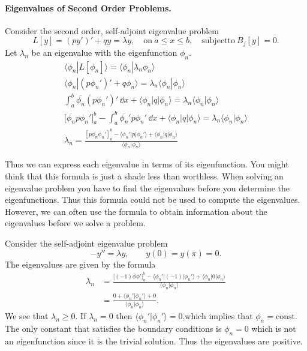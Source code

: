 \paragraph{Eigenvalues of Second Order Problems.}
Consider the second order, self-adjoint eigenvalue problem
\[ L[y] = (p y')' + q y = \lambda y, \quad \mathrm{on}\ a \leq x \leq b,
\quad \mathrm{subject to}\ B_j[y] = 0.\]
Let $\lambda_n$ be an eigenvalue with the eigenfunction $\phi_n$.
\begin{gather*}
  \langle \phi_n | L[\phi_n] \rangle = \langle \phi_n | \lambda_n \phi_n \rangle \\
  \langle \phi_n | (p \phi_n')' + q \phi_n \rangle = \lambda_n 
  \langle \phi_n | \phi_n \rangle \\
  \int_a^b \overline{\phi_n} (p \phi_n')'\,\dd x + \langle \phi_n | q | \phi_n\rangle
  = \lambda_n \langle \phi_n | \phi_n \rangle \\
  \big[\overline{\phi_n} p \phi_n'\big]_a^b - \int_a^b \overline{\phi_n}' p \phi_n'\,\dd x
  + \langle \phi_n | q | \phi_n\rangle = \lambda_n \langle \phi_n | \phi_n \rangle \\
  \boxed{ \lambda_n = \frac{[p \overline{\phi_n} \phi_n']_a^b 
      - \langle \phi_n' | p | \phi_n' \rangle + \langle \phi_n | q | \phi_n \rangle}
    { \langle \phi_n | \phi_n \rangle } }
\end{gather*}

Thus we can express each eigenvalue in terms of its eigenfunction.  You
might think that this formula is just a shade less than worthless.  When
solving an eigenvalue problem you have to find the eigenvalues before
you determine the eigenfunctions.  Thus this formula could not be used
to compute the eigenvalues.  However, we can often use the formula to
obtain information about the eigenvalues before we solve a problem.




\begin{Example}
  Consider the self-adjoint eigenvalue problem
  \[ -y'' = \lambda y, \qquad y(0) = y(\pi) = 0.\]
  The eigenvalues are given by the formula
  \begin{align*}
    \lambda_n &= \frac{\big[(-1) \overline{\phi} \phi'\big]_a^b 
      - \langle \phi_n' | (-1) | \phi_n'\rangle
      + \langle \phi_n | 0 | \phi_n \rangle }
    {\langle \phi_n | \phi_n \rangle} \\
    &= \frac{0 + \langle \phi_n' | \phi_n' \rangle + 0}{\langle \phi_n | \phi_n \rangle}.
  \end{align*}
  We see that $\lambda_n \geq 0$.  If $\lambda_n = 0$ then $\langle \phi_n' | \phi_n' \rangle
  = 0$,which implies that $\phi_n = \mathrm{const}$.  The only constant that
  satisfies the boundary conditions is $\phi_n = 0$ which is not an 
  eigenfunction since it is the trivial solution.  Thus the eigenvalues are 
  positive.
\end{Example}













